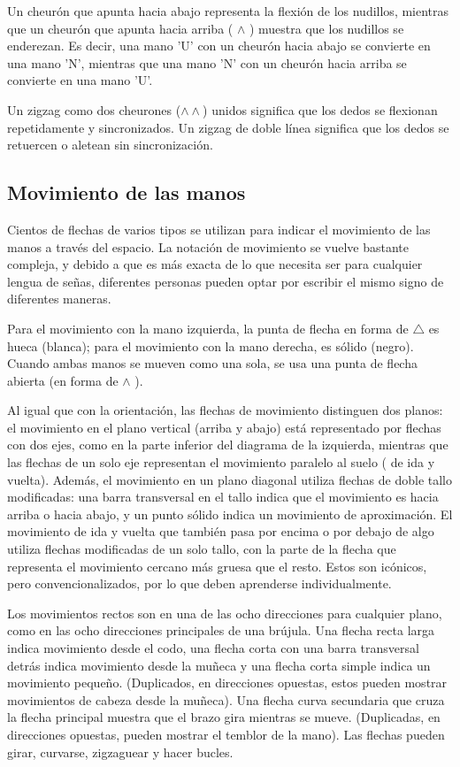 Un cheurón que apunta hacia abajo representa la flexión de los nudillos, mientras que un cheurón que apunta hacia arriba ( $\wedge$ ) muestra que los nudillos se enderezan. Es decir, una mano 'U' con un cheurón hacia abajo se convierte en una mano 'N', mientras que una mano 'N' con un cheurón hacia arriba se convierte en una mano 'U'.

Un zigzag como dos cheurones ($ \wedge\wedge $) unidos significa que los dedos se flexionan repetidamente y sincronizados. Un zigzag de doble línea significa que los dedos se retuercen o aletean sin sincronización.

\subsection{Movimiento de las manos}\label{subsection:state-of-the-art:sl:hand_movement}
Cientos de flechas de varios tipos se utilizan para indicar el movimiento de las manos a través del espacio. La notación de movimiento se vuelve bastante compleja, y debido a que es más exacta de lo que necesita ser para cualquier lengua de señas, diferentes personas pueden optar por escribir el mismo signo de diferentes maneras.

Para el movimiento con la mano izquierda, la punta de flecha en forma de $ \bigtriangleup $ es hueca (blanca); para el movimiento con la mano derecha, es sólido (negro). Cuando ambas manos se mueven como una sola, se usa una punta de flecha abierta (en forma de $ \wedge $ ).

Al igual que con la orientación, las flechas de movimiento distinguen dos planos: el movimiento en el plano vertical (arriba y abajo) está representado por flechas con dos ejes, como en la parte inferior del diagrama de la izquierda, mientras que las flechas de un solo eje representan el movimiento paralelo al suelo ( de ida y vuelta). Además, el movimiento en un plano diagonal utiliza flechas de doble tallo modificadas: una barra transversal en el tallo indica que el movimiento es hacia arriba o hacia abajo, y un punto sólido indica un movimiento de aproximación. El movimiento de ida y vuelta que también pasa por encima o por debajo de algo utiliza flechas modificadas de un solo tallo, con la parte de la flecha que representa el movimiento cercano más gruesa que el resto. Estos son icónicos, pero convencionalizados, por lo que deben aprenderse individualmente.

Los movimientos rectos son en una de las ocho direcciones para cualquier plano, como en las ocho direcciones principales de una brújula. Una flecha recta larga indica movimiento desde el codo, una flecha corta con una barra transversal detrás indica movimiento desde la muñeca y una flecha corta simple indica un movimiento pequeño. (Duplicados, en direcciones opuestas, estos pueden mostrar movimientos de cabeza desde la muñeca). Una flecha curva secundaria que cruza la flecha principal muestra que el brazo gira mientras se mueve. (Duplicadas, en direcciones opuestas, pueden mostrar el temblor de la mano). Las flechas pueden girar, curvarse, zigzaguear y hacer bucles.

